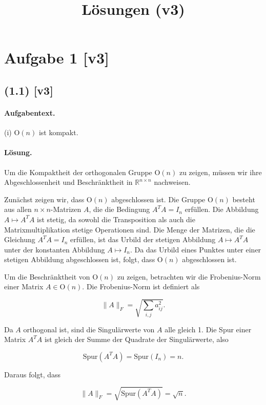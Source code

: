 \documentclass[11pt,a4paper]{article}
\title{Lösungen (v3)}
\date{}
\begin{document}
\maketitle

\section*{Aufgabe 1 [v3]}
\subsection*{(1.1) [v3]}
\paragraph{Aufgabentext.}
(i) $\mathrm{O}(n)$ ist kompakt.

\paragraph{Lösung.}
Um die Kompaktheit der orthogonalen Gruppe $\mathrm{O}(n)$ zu zeigen, müssen wir ihre Abgeschlossenheit und Beschränktheit in $\mathbb{R}^{n \times n}$ nachweisen. 

Zunächst zeigen wir, dass $\mathrm{O}(n)$ abgeschlossen ist. Die Gruppe $\mathrm{O}(n)$ besteht aus allen $n \times n$-Matrizen $A$, die die Bedingung $A^T A = I_n$ erfüllen. Die Abbildung $A \mapsto A^T A$ ist stetig, da sowohl die Transposition als auch die Matrixmultiplikation stetige Operationen sind. Die Menge der Matrizen, die die Gleichung $A^T A = I_n$ erfüllen, ist das Urbild der stetigen Abbildung $A \mapsto A^T A$ unter der konstanten Abbildung $A \mapsto I_n$. Da das Urbild eines Punktes unter einer stetigen Abbildung abgeschlossen ist, folgt, dass $\mathrm{O}(n)$ abgeschlossen ist.

Um die Beschränktheit von $\mathrm{O}(n)$ zu zeigen, betrachten wir die Frobenius-Norm einer Matrix $A \in \mathrm{O}(n)$. Die Frobenius-Norm ist definiert als

\[
\|A\|_F = \sqrt{\sum_{i,j} a_{ij}^2}.
\]

Da $A$ orthogonal ist, sind die Singulärwerte von $A$ alle gleich 1. Die Spur einer Matrix $A^T A$ ist gleich der Summe der Quadrate der Singulärwerte, also

\[
\text{Spur}(A^T A) = \text{Spur}(I_n) = n.
\]

Daraus folgt, dass

\[
\|A\|_F = \sqrt{\text{Spur}(A^T A)} = \sqrt{n}.
\]
\end{document}
